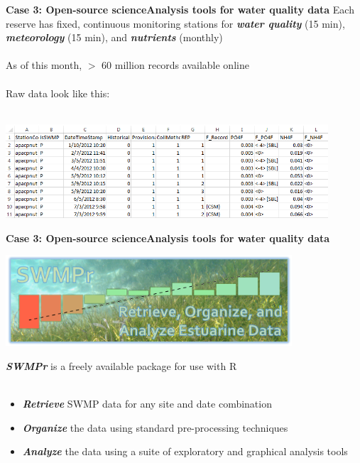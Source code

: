 \documentclass[serif]{beamer}\usepackage[]{graphicx}\usepackage[]{color}
\newcommand{\emtxt}[1]{\textbf{\textit{#1}}}
\begin{document}
\begin{frame}[t]{\textbf{Case 3: Open-source science}}{\textbf{Analysis tools for water quality data}}
Each reserve has fixed, continuous monitoring stations for \emtxt{water quality} (15 min), \emtxt{meteorology} (15 min), and \emtxt{nutrients} (monthly)\\~\\
As of this month, $>$ 60 million records available online\\~\\
Raw data look like this:\\~\\
\centerline{\includegraphics[width = 0.9\textwidth]{fig/qaqc_ex.png}}
\end{frame}

\begin{frame}{\textbf{Case 3: Open-source science}}{\textbf{Analysis tools for water quality data}}
\centerline{\includegraphics[width = 0.8\textwidth]{fig/swmpr_logo.png}}
\vspace{0.15in}
\emtxt{SWMPr} is a freely available package for use with R \\~\\
\begin{itemize}
\item \emtxt{Retrieve} SWMP data for any site and date combination
\item \emtxt{Organize} the data using standard pre-processing techniques
\item \emtxt{Analyze} the data using a suite of exploratory and graphical analysis tools
\end{itemize}
\end{frame}
\end{document}
